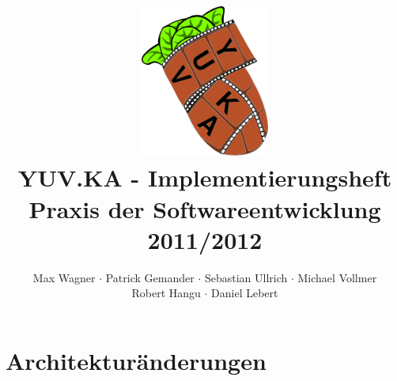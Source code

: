 \documentclass{scrartcl}
\begin{document}
\title{
    \hspace{-0.5cm} \includegraphics[height=5cm]{../../pflichtenheft/resources/logo.png} \\[1cm]
    \Huge{YUV.KA - Implementierungsheft} \\ \large{Praxis der Softwareentwicklung 2011/2012}
}
\author{Max Wagner $\cdot$ Patrick Gemander $\cdot$ Sebastian Ullrich $\cdot$ Michael Vollmer \\ Robert Hangu $\cdot$ Daniel Lebert}
\maketitle

\newpage
\mbox{}
\newpage
\mbox{}

\tableofcontents
\clearpage

\section{Architekturänderungen}

\clearpage
\end{document}
